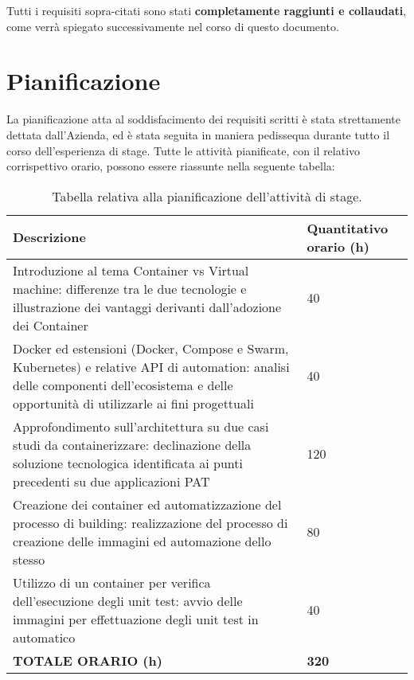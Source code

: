 Tutti i requisiti sopra-citati sono stati \textbf{completamente raggiunti e collaudati}, come verrà spiegato successivamente nel corso di questo documento.

\newpage
\section{Pianificazione}
La pianificazione atta al soddisfacimento dei requisiti scritti è stata strettamente dettata dall'Azienda, ed è stata seguita in maniera pedissequa durante tutto il corso dell'esperienza di stage.
Tutte le attività pianificate, con il relativo corrispettivo orario, possono essere riassunte nella seguente tabella:
\begin{table}[h!]
\centering
    \renewcommand{\arraystretch}{1.5}
    \begin{tabular}{|m{25em} | m{}|} 
    \hline
        \hfil \textbf{Descrizione} & \hfil \textbf{Quantitativo orario (h)} \\
    \hline\hline
        Introduzione al tema Container vs Virtual machine: differenze tra le due tecnologie e illustrazione dei vantaggi derivanti dall'adozione dei Container & \hfil 40 \\ 
    \hline
       Docker ed estensioni (Docker, Compose e Swarm, Kubernetes) e relative API di automation: analisi delle componenti dell'ecosistema e delle opportunità di utilizzarle ai fini progettuali & \hfil 40 \\
    \hline
        Approfondimento sull'architettura su due casi studi da containerizzare: declinazione della soluzione tecnologica identificata ai punti precedenti su due applicazioni PAT & \hfil 120 \\
    \hline
        Creazione dei container ed automatizzazione del processo di building: realizzazione del processo di creazione delle immagini ed automazione dello stesso & \hfil 80 \\
    \hline
        Utilizzo di un container per verifica dell'esecuzione degli unit test: avvio delle immagini per effettuazione degli unit test in automatico & \hfil 40 \\ [1ex] 
   \hline
    \textbf{TOTALE ORARIO (h)} & \hfil \textbf{320}\\
    \hline
    \end{tabular}
\medskip
\caption{Tabella relativa alla pianificazione dell'attività di stage.}
\label{table:tabella relativa alla pianificazione dello stage stabilita dall'Azienda}
\end{table}